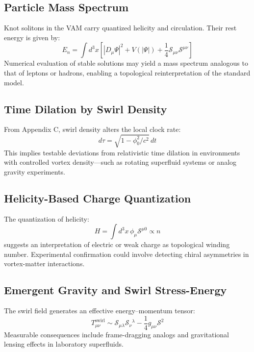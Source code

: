         \subsection{Particle Mass Spectrum}
        Knot solitons in the VAM carry quantized helicity and circulation. Their rest energy is given by:
        \begin{equation}
            E_n = \int d^3x \left[ |D_\mu \Psi|^2 + V(|\Psi|) + \frac{1}{4} \mathcal{S}_{\mu\nu} \mathcal{S}^{\mu\nu} \right]
        \end{equation}
        Numerical evaluation of stable solutions may yield a mass spectrum analogous to that of leptons or hadrons, enabling a topological reinterpretation of the standard model.

        \subsection{Time Dilation by Swirl Density}
        From Appendix C, swirl density alters the local clock rate:
        \begin{equation}
            d\tau = \sqrt{1 - \phi_0^2 / c^2} \, dt
        \end{equation}
        This implies testable deviations from relativistic time dilation in environments with controlled vortex density—such as rotating superfluid systems or analog gravity experiments.

        \subsection{Helicity-Based Charge Quantization}
        The quantization of helicity:
        \begin{equation}
            H = \int d^3x \, \phi_\mu \mathcal{S}^{\mu0} \propto n
        \end{equation}
        suggests an interpretation of electric or weak charge as topological winding number. Experimental confirmation could involve detecting chiral asymmetries in vortex-matter interactions.

        \subsection{Emergent Gravity and Swirl Stress-Energy}
        The swirl field generates an effective energy--momentum tensor:
        \begin{equation}
            T_{\mu\nu}^{\text{swirl}} \sim \mathcal{S}_{\mu\lambda} \mathcal{S}_\nu{}^\lambda - \frac{1}{4} g_{\mu\nu} \mathcal{S}^2
        \end{equation}
        Measurable consequences include frame-dragging analogs and gravitational lensing effects in laboratory superfluids.

